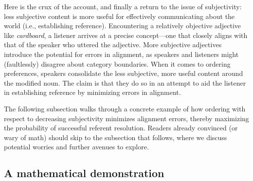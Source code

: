 \documentclass[preprint,authoryear]{elsarticle}\frenchspacing
\newcommand{\jd}[1]{\textcolor{Blue}{[jd: #1]}}
\begin{document}
Here is the crux of the account, and finally a return to the issue of subjectivity: less subjective content is more useful for effectively communicating about the world (i.e., establishing reference). %
Encountering a relatively objective adjective like \emph{cardboard}, a listener arrives at a precise concept---one that closely aligns with that of the speaker who uttered the adjective. More subjective adjectives introduce the potential for errors in alignment, as speakers and listeners might (faultlessly) disagree about category boundaries. When it comes to ordering preferences, speakers consolidate the less subjective, more useful content around the modified noun. The claim is that they do so in an attempt to aid the listener in establishing reference by minimizing errors in alignment. 

The following subsection walks through a concrete example of how ordering with respect to decreasing subjectivity minimizes alignment errors, thereby maximizing the probability of successful referent resolution. Readers already convinced (or wary of math) should skip to the subsection that follows, where we discuss potential worries and further avenues to explore.

\subsection{A mathematical demonstration}
\end{document}
